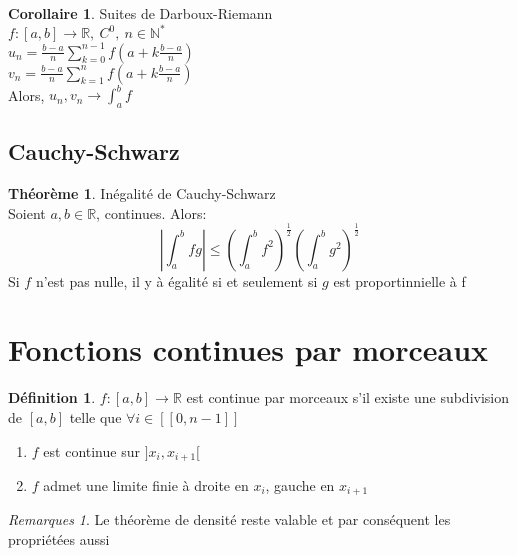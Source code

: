\documentclass[fleqn]{article}
\theoremstyle{definition} \newtheorem*{defi}{D\'efinition}
\theoremstyle{definition} \newtheorem*{theo}{Th\'eor\`eme}
\theoremstyle{definition} \newtheorem*{coro}{Corollaire}
\theoremstyle{remark} \newtheorem*{rqs}{Remarques}
\theoremstyle{definition} \newtheorem*{prop}{Propri\'et\'e}
\begin{document}
\begin{coro} Suites de Darboux-Riemann \\
	$f:[a,b] \rightarrow \mathbb{R},\ C^0,\ n \in \mathbb{N}^*$ \\
	$u_n = \frac{b-a}{n} \sum_{k= 0}^{n-1} f(a + k\frac{b-a}{n})$ \\
	$v_n = \frac{b-a}{n} \sum_{k= 1}^{n} f(a + k\frac{b-a}{n})$ \\
	Alors, $u_n, v_n \rightarrow \int_a^b f$
\end{coro}

\subsection{Cauchy-Schwarz}
\begin{theo} In\'egalit\'e de Cauchy-Schwarz \\
	Soient $a,b \in \mathbb{R}$, continues. Alors:
	\[\left|\int_a^b fg\right| \leq \left(\int_a^b f^2\right)^\frac{1}{2} \left(\int_a^b g^2\right)^\frac{1}{2}\]
	Si $f$ n'est pas nulle, il y \`a \'egalit\'e si et seulement si $g$ est proportinnielle \`a f
\end{theo}

\section{Fonctions continues par morceaux}
\begin{defi}
	$f:[a,b] \rightarrow \mathbb{R}$ est continue par morceaux s'il existe une subdivision de $[a,b]$ telle que $\forall i \in [\![0,n-1]\!]$
	\begin{enumerate}
		\item $f$ est continue sur $]x_i, x_{i+1}[$
		\item $f$ admet une limite finie \`a droite en $x_i$, gauche en $x_{i+1}$
	\end{enumerate}
\end{defi}

\begin{rqs}
	Le th\'eor\`eme de densit\'e reste valable et par cons\'equent les propri\'et\'ees aussi
\end{rqs}

\end{document}

